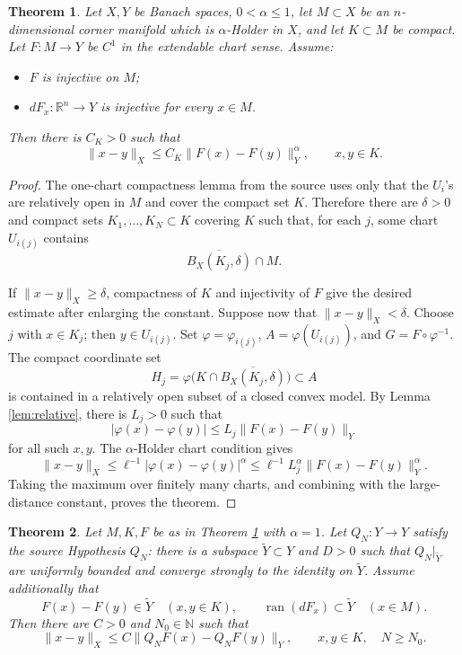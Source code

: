 \documentclass[11pt]{article}
\newtheorem{theorem}{Theorem}
\newcommand{\R}{\mathbb R}
\newcommand{\N}{\mathbb N}
\newcommand{\ran}{\operatorname{ran}}
\begin{document}
\begin{theorem}\label{thm:corner-infinite}
Let \(X,Y\) be Banach spaces, \(0<\alpha\le1\), let \(M\subset X\) be an \(n\)-dimensional corner manifold which is \(\alpha\)-Holder in \(X\), and let \(K\subset M\) be compact.  Let \(F:M\to Y\) be \(C^1\) in the extendable chart sense.  Assume:
\begin{itemize}
\item \(F\) is injective on \(M\);
\item \(dF_x:\R^n\to Y\) is injective for every \(x\in M\).
\end{itemize}
Then there is \(C_K>0\) such that
\[
  \|x-y\|_X\le C_K\|F(x)-F(y)\|_Y^\alpha,
  \qquad x,y\in K.
\]
\end{theorem}

\begin{proof}
The one-chart compactness lemma from the source uses only that the \(U_i\)'s are relatively open in \(M\) and cover the compact set \(K\).  Therefore there are \(\delta>0\) and compact sets \(K_1,\dots,K_N\subset K\) covering \(K\) such that, for each \(j\), some chart \(U_{i(j)}\) contains
\[
  \overline{B_X(K_j,\delta)}\cap M.
\]

If \(\|x-y\|_X\ge\delta\), compactness of \(K\) and injectivity of \(F\) give the desired estimate after enlarging the constant.  Suppose now that \(\|x-y\|_X<\delta\).  Choose \(j\) with \(x\in K_j\); then \(y\in U_{i(j)}\).  Set \(\varphi=\varphi_{i(j)}\), \(A=\varphi(U_{i(j)})\), and \(G=F\circ\varphi^{-1}\).  The compact coordinate set
\[
  H_j=\varphi\bigl(K\cap \overline{B_X(K_j,\delta)}\bigr)\subset A
\]
is contained in a relatively open subset of a closed convex model.  By Lemma \ref{lem:relative}, there is \(L_j>0\) such that
\[
  |\varphi(x)-\varphi(y)|\le L_j\|F(x)-F(y)\|_Y
\]
for all such \(x,y\).  The \(\alpha\)-Holder chart condition gives
\[
  \|x-y\|_X\le \ell^{-1}|\varphi(x)-\varphi(y)|^\alpha
  \le \ell^{-1}L_j^\alpha\|F(x)-F(y)\|_Y^\alpha.
\]
Taking the maximum over finitely many charts, and combining with the large-distance constant, proves the theorem.
\end{proof}

\begin{theorem}\label{thm:corner-finite}
Let \(M,K,F\) be as in Theorem \ref{thm:corner-infinite} with \(\alpha=1\).  Let \(Q_N:Y\to Y\) satisfy the source Hypothesis \(Q_N\): there is a subspace \(\widetilde Y\subset Y\) and \(D>0\) such that \(Q_N|_{\widetilde Y}\) are uniformly bounded and converge strongly to the identity on \(\widetilde Y\).  Assume additionally that
\[
  F(x)-F(y)\in\widetilde Y\quad(x,y\in K),
  \qquad
  \ran(dF_x)\subset\widetilde Y\quad(x\in M).
\]
Then there are \(C>0\) and \(N_0\in\N\) such that
\[
  \|x-y\|_X\le C\|Q_NF(x)-Q_NF(y)\|_Y,
  \qquad x,y\in K,\quad N\ge N_0.
\]
\end{theorem}
\end{document}
